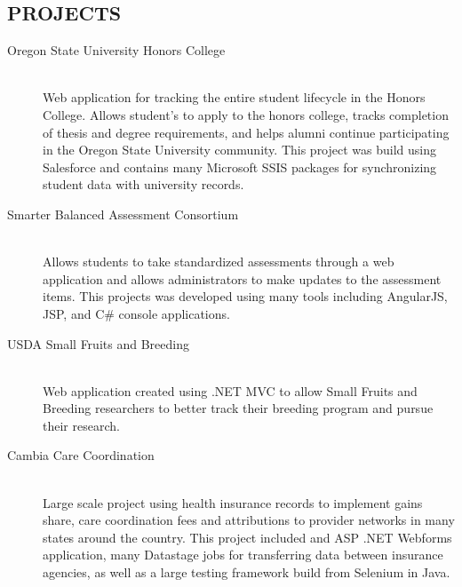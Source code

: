 \documentclass[margin]{res}
\begin{document}
\begin{resume}
 
\section{PROJECTS} 
                \begin{description}
                  \item[Oregon State University Honors College] \hfill \\
                  Web application for tracking the entire student lifecycle in the Honors College. Allows student's to apply to the honors college, tracks completion of thesis and degree requirements, and helps alumni continue participating in the Oregon State University community. This project was build using Salesforce and contains many Microsoft SSIS packages for synchronizing student data with university records. 
                  \item[Smarter Balanced Assessment Consortium] \hfill \\
                  Allows students to take standardized assessments through a web application and allows administrators to make updates to the assessment items. This projects was developed using many tools including AngularJS, JSP, and C\# console applications. 
                  \item[USDA Small Fruits and Breeding] \hfill \\
                  Web application created using .NET MVC to allow Small Fruits and Breeding researchers to better track their breeding program and pursue their research. 
                  \item[Cambia Care Coordination] \hfill \\
                  Large scale project using health insurance records to implement gains share, care coordination fees and attributions to provider networks in many states around the country. This project included and ASP .NET Webforms application, many Datastage jobs for transferring data between insurance agencies, as well as a large testing framework build from Selenium in Java. 
                \end{description}
                
\newpage
        

\end{resume}
\end{document}
